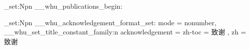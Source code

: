 \cs_set:Npn \__whu_publications_begin:
  {
    \begin{achievements}
  }
\cs_set:Npn \__whu_publications_end:
  {
    \end{achievements}
  }



\cs_set:Npn \__whu_acknowledgement_format_set:
  {
      {
        mode    = nonumber,
      }
    \__whu_set_title_constant_family:n
      {
        acknowledgement =
          {
            zh-toc = 致谢 ,
            zh     = 致\qquad 谢
          }
      }
  }



